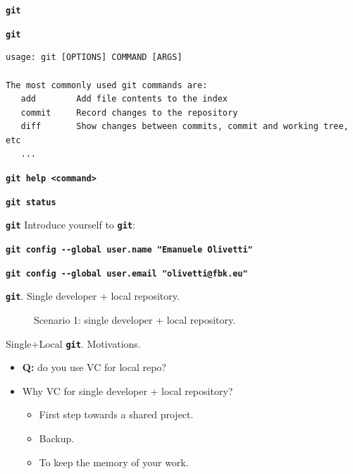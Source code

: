 \documentclass{beamer}
\newcommand{\git}{\texttt{\textbf{git}}\xspace}
\begin{document}
\begin{frame}[containsverbatim]{\git}
  \begin{center}
  \item \texttt{\textbf{git}}
  \end{center}
\begin{verbatim}
usage: git [OPTIONS] COMMAND [ARGS]

The most commonly used git commands are:
   add        Add file contents to the index
   commit     Record changes to the repository
   diff       Show changes between commits, commit and working tree, etc
   ...
\end{verbatim}
  \begin{center}
    \texttt{\textbf{git help <command>}}
  \end{center}
  \begin{center}
    \texttt{\textbf{git status}}
  \end{center}
\end{frame}

\begin{frame}{\git}
  Introduce yourself to \git:
  \begin{center}
    \small
    \texttt{\textbf{git config -{}-global user.name "Emanuele Olivetti"}}
  \end{center}
  \vspace{0.2cm}
  \begin{center}
    \small
    \texttt{\textbf{git config -{}-global user.email "olivetti@fbk.eu"}}
  \end{center}
\end{frame}

\begin{frame}{\git. Single developer + local repository.}
  \begin{figure}
    \centering
    Scenario 1: single developer + local repository.
  \end{figure}
\end{frame}

\begin{frame}{Single+Local \git. Motivations.}
  \begin{itemize}\setlength{\itemsep}{+3mm}
  \item \textbf{Q:} do you use VC for local repo?
  \item Why VC for single developer + local repository?
    \begin{itemize}\setlength{\itemsep}{+2mm}
    \item First step towards a shared project.
    \item Backup.
    \item To keep the memory of your work.
    \end{itemize}
  \end{itemize}
\end{frame}
\end{document}
